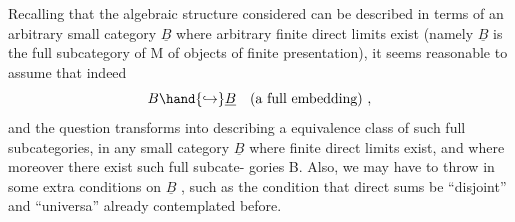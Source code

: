 Recalling that the algebraic structure considered can be described
in terms of an arbitrary small category $\underline{B}$ where arbitrary finite direct
limits exist  (namely $\underline{B}$ is the full subcategory of M of objects of
finite presentation),  it seems reasonable to assume that indeed
\[ B \hand{\hookrightarrow} \underline{B} \quad \text{(a full embedding)} \ , \]
and the question transforms into describing a  equivalence class 
of such full subcategories,  in  any small category $\underline{B}$  where finite
direct limits exist,  and where moreover there exist such full subcate-%
gories B.  Also,  we may  have to throw in some extra conditions on
$\underline{B}$ ,  such as the condition that direct sums be ``disjoint'' and ``universa'' \hand{\unsure{$(^{*})$}}
already contemplated before.
